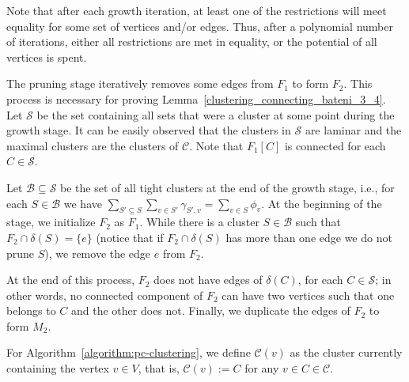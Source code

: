 Note that after each growth iteration, at least one of the restrictions will meet equality for some set of vertices and/or edges. Thus, after a polynomial number of iterations, either all restrictions are met in equality, or the potential of all vertices is spent.

The pruning stage iteratively removes some edges from \(F_1\) to form \(F_2\). This process is necessary for proving Lemma~\ref{clustering_connecting_bateni_3_4}. Let \(\mathcal{S}\) be the set containing all sets that were a cluster at some point during the growth stage. It can be easily observed that the clusters in \(\mathcal{S}\) are laminar and the maximal clusters are the clusters of \(\mathcal{C}\). Note that \(F_1[C]\) is connected for each \(C \in \mathcal{S}\).

Let \(\mathcal{B} \subseteq \mathcal{S}\) be the set of all tight clusters at the end of the growth stage, i.e., for each \(S \in \mathcal{B}\) we have \(\sum_{S' \subseteq S} \sum_{v \in S'} \gamma_{S', v} = \sum_{v \in S} \phi_v\). At the beginning of the stage, we initialize \(F_2\) as \(F_1\). While there is a cluster \(S \in \mathcal{B}\) such that \(F_2 \cap \delta(S) = \{e\}\) (notice that if \(F_2 \cap \delta(S)\) has more than one edge we do not prune \(S\)), we remove the edge \(e\) from \(F_2\).

At the end of this process, \(F_2\) does not have edges of \(\delta(C)\), for each \(C \in \mathcal{S}\); in other words, no connected component of \(F_2\) can have two vertices such that one belongs to \(C\) and the other does not. Finally, we duplicate the edges of \(F_2\) to form \(M_2\).

For Algorithm~\ref{algorithm:pc-clustering}, we define \(\mathcal{C}(v)\) as the cluster currently containing the vertex \(v \in V\), that is, \(\mathcal{C}(v):= C\) for any \(v \in C \in \mathcal{C}\).

